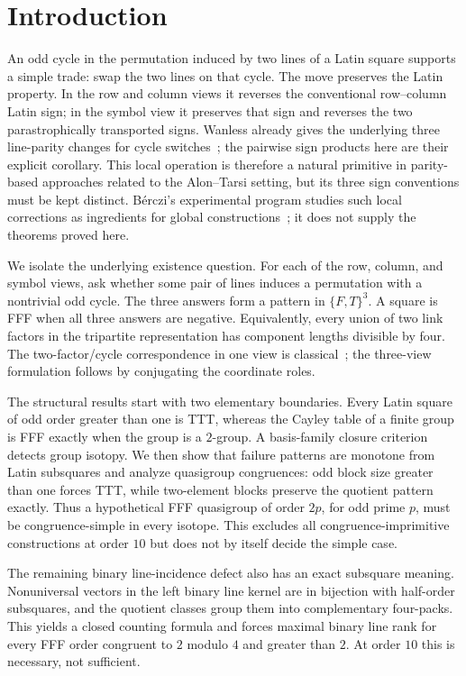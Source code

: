 \section{Introduction}

An odd cycle in the permutation induced by two lines of a Latin square
supports a simple trade: swap the two lines on that cycle.  The move preserves
the Latin property.  In the row and column views it reverses the conventional
row--column Latin sign; in the symbol view it preserves that sign and reverses
the two parastrophically transported signs. Wanless already gives the
underlying three line-parity changes for cycle
switches~\cite[Proposition~1]{Wanless2004CycleSwitches}; the pairwise sign
products here are their explicit corollary. This local operation is therefore
a natural primitive in parity-based approaches related to the Alon--Tarsi
setting, but its three sign conventions must be kept distinct.  B\'erczi's
experimental program studies such local corrections as ingredients for
global constructions~\cite{Berczi2026}; it does not supply the theorems proved
here.

We isolate the underlying existence question.  For each of the row, column,
and symbol views, ask whether some pair of lines induces a permutation with a
nontrivial odd cycle.  The three answers form a pattern in $\{F,T\}^3$.  A
square is FFF when all three answers are negative.  Equivalently, every union
of two link factors in the tripartite representation has component lengths
divisible by four. The two-factor/cycle correspondence in one view is
classical~\cite[Section~3]{WanlessIhrig2005Factorizations}; the three-view
formulation follows by conjugating the coordinate roles.

The structural results start with two elementary boundaries.  Every
Latin square of odd order greater than one is TTT, whereas the Cayley table of a finite group
is FFF exactly when the group is a
$2$-group.  A basis-family closure criterion detects group isotopy.  We then
show that failure patterns are monotone from Latin subsquares and analyze
quasigroup congruences: odd block size greater than one forces TTT, while two-element blocks
preserve the quotient pattern exactly.  Thus a hypothetical FFF quasigroup of
order $2p$, for odd prime $p$, must be congruence-simple in every isotope.
This excludes all congruence-imprimitive constructions at order $10$ but does
not by itself decide the simple case.

The remaining binary line-incidence defect also has an exact subsquare
meaning.  Nonuniversal vectors in the left binary line kernel are in
bijection with half-order subsquares, and the quotient classes group them
into complementary four-packs.  This yields a closed counting formula and
forces maximal binary line rank for every FFF order congruent to $2$ modulo
$4$ and greater than $2$.  At order $10$ this is necessary, not sufficient.

